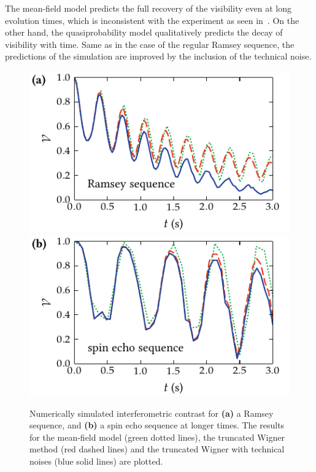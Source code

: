 The mean-field model predicts the full recovery of the visibility even at long evolution times, which is inconsistent with the experiment as seen in~.
On the other hand, the quasiprobability model qualitatively predicts the decay of visibility with time.
Same as in the case of the regular Ramsey sequence, the predictions of the simulation are improved by the inclusion of the technical noise.

\begin{figure}
    \centerline{%
    \includegraphics{figures_generated/bec_noise/ramsey_visibility_long.pdf}%
    \includegraphics{figures_generated/bec_noise/echo_visibility_long.pdf}}

    \caption[Experimental and numerically simulated interferometric constrast in Ramsey and spin echo sequences for longer times]{
    Numerically simulated interferometric contrast for \textbf{(a)} a Ramsey sequence, and \textbf{(b)} a spin echo sequence at longer times.
    The results for the mean-field model (green dotted lines), the truncated Wigner method (red dashed lines) and the truncated Wigner with technical noises (blue solid lines) are plotted.}%

    \label{fig:bec-noise:visibility:visibility-long}
\end{figure}

